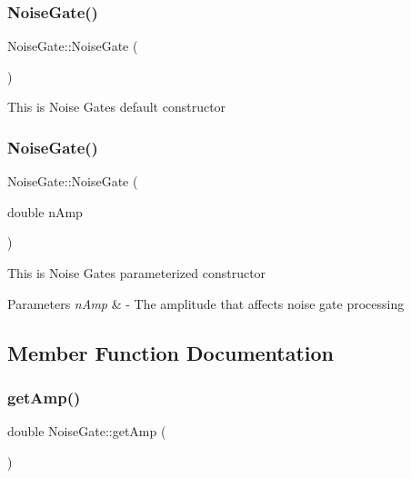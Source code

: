 \subsubsection{\texorpdfstring{Noise\+Gate()}{NoiseGate()}\hspace{0.1cm}{\footnotesize\ttfamily [1/2]}}
{\footnotesize\ttfamily Noise\+Gate\+::\+Noise\+Gate (\begin{DoxyParamCaption}{ }\end{DoxyParamCaption})}

This is Noise Gate\textquotesingle{}s default constructor \mbox{\label{classNoiseGate_ad305ed6c1cd711e5a78026815f94f6c5}} 
\subsubsection{\texorpdfstring{Noise\+Gate()}{NoiseGate()}\hspace{0.1cm}{\footnotesize\ttfamily [2/2]}}
{\footnotesize\ttfamily Noise\+Gate\+::\+Noise\+Gate (\begin{DoxyParamCaption}\item[{double}]{n\+Amp }\end{DoxyParamCaption})}

This is Noise Gate\textquotesingle{}s parameterized constructor 
\begin{DoxyParams}{Parameters}
{\em n\+Amp} & -\/ The amplitude that affects noise gate processing \\
\hline
\end{DoxyParams}


\subsection{Member Function Documentation}
\mbox{\label{classNoiseGate_aa3bc6ff59a5448071d8b78ece44190e7}} 
\subsubsection{\texorpdfstring{get\+Amp()}{getAmp()}}
{\footnotesize\ttfamily double Noise\+Gate\+::get\+Amp (\begin{DoxyParamCaption}{ }\end{DoxyParamCaption})}

